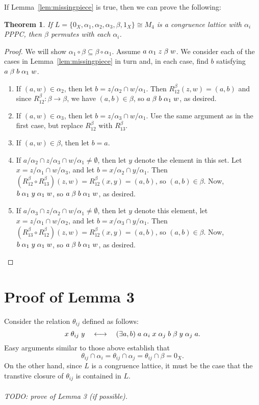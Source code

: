 \documentclass{amsart}
\theoremstyle{plain}
\newtheorem{theorem}{Theorem}
\theoremstyle{definition}
\theoremstyle{definition}
\numberwithin{equation}{section}
\newcommand{\<}{\ensuremath{\langle}}
\renewcommand{\>}{\ensuremath{\rangle}}
\newcommand{\rel}{\ensuremath{\mathrel}}
\begin{document}
If Lemma~\ref{lem:missingpiece} is true, then we can prove the following:
\begin{theorem}
If $L = \{0_X, \alpha_1, \alpha_2, \alpha_3, \beta, 1_X\} \cong  M_4$ is a
congruence lattice with $\alpha_i$ \ac{PPPC}, then $\beta$ permutes with each $\alpha_i$.
\end{theorem}
\begin{proof}
We will show $\alpha_1 \circ \beta \subseteq \beta \circ \alpha_1$.
Assume $a \rel{\alpha_1} z \rel{\beta} w$.  We consider each of the cases in
Lemma~\ref{lem:missingpiece} in turn and,
in each case, find $b$ satisfying $a \rel{\beta} b \rel{\alpha_1} w$.
\begin{enumerate}
\item If $(a,w) \in \alpha_2$, then let $b = z/\alpha_2 \cap w/\alpha_1$.  Then
$R^\beta_{12}(z,w) = (a,b)$ and since 
$R^\beta_{12}: \beta \rightarrow \beta$, we have $(a,b) \in \beta$, so 
$a \rel{\beta} b \rel{\alpha_1} w$, as desired.  
\item If $(a,w) \in \alpha_3$, then let $b = z/\alpha_3 \cap w/\alpha_1$. Use the same
argument as in the first case, but replace $R^\beta_{12}$ with $R^\beta_{13}$. 
\item If $(a,w) \in \beta$, then let $b = a$. 
\item If  $a/\alpha_2 \cap z/\alpha_3 \cap w/\alpha_1 \neq \emptyset$, then let
  $y$ denote the element in this set.  Let $x = z/\alpha_1 \cap w/\alpha_3$, and
  let $b = x/\alpha_2\cap y/\alpha_1$.  
  Then $(R^\beta_{12}\circ R^\beta_{13})(z,w) = R^\beta_{12}(x,y) = (a,b)$, so $(a,b) \in \beta$.
  Now, $b\rel{\alpha_1} y \rel{\alpha_1} w$, so
  $a \rel{\beta} b \rel{\alpha_1} w$, as desired.
\item If $a/\alpha_3 \cap z/\alpha_2 \cap w/\alpha_1 \neq \emptyset$, then let 
  $y$ denote this element, let $x = z/\alpha_1 \cap w/\alpha_2$, and
  let $b = x/\alpha_3\cap y/\alpha_1$.  
  Then $(R^\beta_{13}\circ R^\beta_{12})(z,w) = R^\beta_{12}(x,y) = (a,b)$, so $(a,b) \in \beta$.
  Now, $b\rel{\alpha_1} y \rel{\alpha_1} w$, so $a \rel{\beta} b \rel{\alpha_1} w$, as desired.
\end{enumerate}
\end{proof}

\section{Proof of Lemma 3}
Consider the relation $\theta_{ij}$ defined as follows:
\[
x \rel{\theta_{ij}} y \quad \longleftrightarrow \quad (\exists a, b) \;
a \rel{\alpha_i} x \rel{\alpha_j} b \rel{\beta} y \rel{\alpha_j} a.
\]
Easy arguments similar to those above establish that 
\[
\theta_{ij} \cap \alpha_i = \theta_{ij} \cap \alpha_j =
\theta_{ij} \cap \beta = 0_X.\]
On the other hand, since $L$ is a congruence lattice, it must be the case that
the transtive closure of $\theta_{ij}$ is contained in $L$.\\
\\
{\it TODO: prove of Lemma 3 (if possible).}
\end{document}
